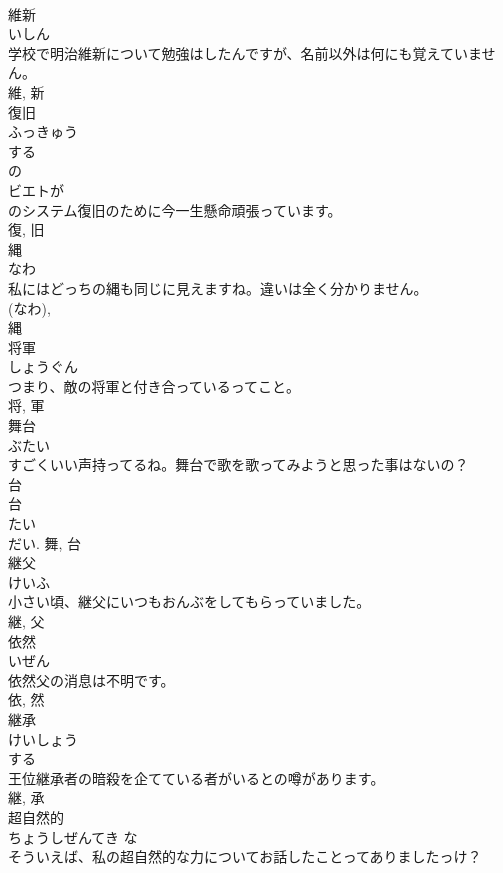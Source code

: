 \documentclass[8pt]{extreport}
\begin{document}
\begin{CJK}{UTF8}{min}
\\	維新	
\\	いしん	
\\	学校で明治維新について勉強はしたんですが、名前以外は何にも覚えていません。	
\\	維, 新	
\\	復旧	
\\	ふっきゅう	
\\	する 
\\	の 
\\	ビエトが
\\	のシステム復旧のために今一生懸命頑張っています。	
\\	復, 旧	
\\	縄	
\\	なわ	
\\	私にはどっちの縄も同じに見えますね。違いは全く分かりません。	
\\	(なわ), 
\\	縄	
\\	将軍	
\\	しょうぐん	
\\	つまり、敵の将軍と付き合っているってこと。	
\\	将, 軍	
\\	舞台	
\\	ぶたい	
\\	すごくいい声持ってるね。舞台で歌を歌ってみようと思った事はないの？	
\\	台 
\\	台 
\\	たい 
\\	だい.	舞, 台	
\\	継父	
\\	けいふ	
\\	小さい頃、継父にいつもおんぶをしてもらっていました。	
\\	継, 父	
\\	依然	
\\	いぜん	
\\	依然父の消息は不明です。	
\\	依, 然	
\\	継承	
\\	けいしょう	
\\	する 
\\	王位継承者の暗殺を企てている者がいるとの噂があります。	
\\	継, 承	
\\	超自然的	
\\	ちょうしぜんてき	な 
\\	そういえば、私の超自然的な力についてお話したことってありましたっけ？	

\end{CJK}
\end{document}
